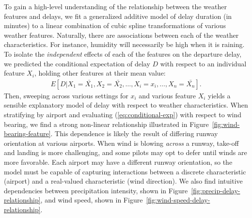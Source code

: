 \documentclass[twocolumn]{article}
\begin{document}
To gain a high-level understanding of the relationship between the weather features and delays, we fit a generalized additive model \citep{hastie1990generalized} of delay duration (in minutes) to a linear combination of cubic spline transformations of various weather features. Naturally, there are associations between each of the weather characteristics. For instance, humidity will necessarily be high when it is raining. To isolate the \emph{independent} effects of each of the features on the departure delay, we predicted the conditional expectation of delay $D$ with respect to an individual feature $X_i$, holding other features at their mean value:
\begin{align}
    \label{eq:conditional-exp}
    E[D|X_1=\bar{X_1}, X_2=\bar{X_2}, \ldots, X_i = x_i, \ldots, X_n = \bar{X_n}].
\end{align}
Then, sweeping across various settings for $x_i$ and various feature $X_i$ yields a sensible explanatory model of delay with respect to weather characteristics. When stratifying by airport and evaluating (\ref{eq:conditional-exp}) with respect to wind bearing, we find a strong non-linear relationship illustrated in Figure~\ref{fig:wind-bearing-feature}. 
This dependence is likely the result of differing runway orientation at various airports. When wind is blowing \emph{across} a runway, take-off and landing is more challenging, and some pilots may opt to defer until winds are more favorable. Each airport may have a different runway orientation, so the model must be capable of capturing interactions between a discrete characteristic (airport) and a real-valued characteristic (wind direction).
We also find intuitive dependencies between precipitation intensity, shown in Figure~\ref{fig:precip-delay-relationship}, and wind speed, shown in Figure~\ref{fig:wind-speed-delay-relationship}.
\end{document}
